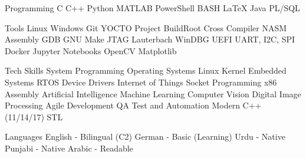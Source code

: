 

\begin{cvskills}

  \cvskill
    {Programming} %
    {C \acvSep C++ \acvSep Python \acvSep MATLAB \acvSep PowerShell \acvSep BASH \acvSep LaTeX \acvSep Java \acvSep PL/SQL} %

  \cvskill
    {Tools} %
    {Linux \acvSep Windows \acvSep Git \acvSep YOCTO Project \acvSep BuildRoot \acvSep Cross Compiler \acvSep NASM Assembly \acvSep GDB \acvSep GNU Make \acvSep JTAG \acvSep Lauterbach \acvSep WinDBG \acvSep UEFI \acvSep UART, I2C, SPI \acvSep Docker \acvSep Jupyter Notebooks \acvSep OpenCV \acvSep Matplotlib} %

  \cvskill
    {Tech Skills} %
    {System Programming \acvSep Operating Systems \acvSep Linux Kernel \acvSep Embedded Systems \acvSep RTOS \acvSep Device Drivers \acvSep Internet of Things \acvSep Socket Programming \acvSep x86 Assembly \acvSep Artificial Intelligence \acvSep Machine Learning \acvSep Computer Vision \acvSep Digital Image Processing \acvSep Agile Development \acvSep QA Test and Automation \acvSep Modern C++ (11/14/17) \acvSep STL} %

  \cvskill
    {Languages} %
    {English - Bilingual (C2) \acvSep German - Basic (Learning) \acvSep Urdu - Native \acvSep Punjabi - Native \acvSep Arabic - Readable} %

\end{cvskills}
